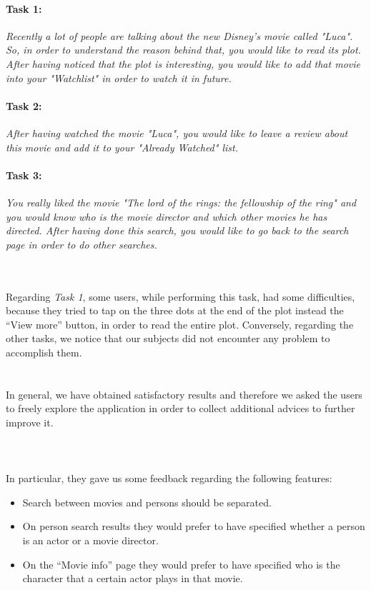 \documentclass[12pt, a4paper]{article}
\numberwithin{figure}{section}
\begin{document}
\paragraph{Task 1:} \textit{Recently a lot of people are talking about the new Disney's movie called "Luca". So,  
in order to understand the reason behind that, you would like to read its plot. After having noticed that the plot is 
interesting, you would like to add that movie into your "Watchlist" in order to watch it in future.}

\paragraph{Task 2:} \textit{After having watched the movie "Luca", you would like to leave a review about this movie and 
add it to your "Already Watched" list.}

\paragraph{Task 3:} \textit{You really liked the movie "The lord of the rings: the fellowship of the ring" and you would know
who is the movie director and which other movies he has directed. After having done this search, you would like to go back
to the search page in order to do other searches.}

\mbox{}\\\\
Regarding \textit{Task 1}, some users, while performing this task, had some difficulties, because they tried to tap on 
the three dots at the end of the plot instead the “View more” button, in order to read the entire plot.
Conversely, regarding the other tasks, we notice that our subjects did not encounter any problem to accomplish them.\\\\\\
In general, we have obtained satisfactory results and therefore we asked the users to freely explore the application in order 
to collect additional advices to further improve it.\\\\\\\\
In particular, they gave us some feedback regarding the following features:
\begin{itemize}
	\item {Search between movies and persons should be separated.}
	\item {On person search results they would prefer to have specified whether a person is an actor or 
	a movie director.}
	\item {On the “Movie info” page they would prefer to have specified who is the character that a certain
	actor plays in that movie.}
\end{itemize}
\end{document}
